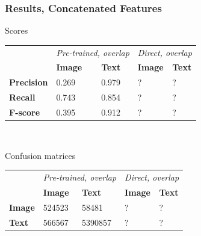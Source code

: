 \begin{frame}
\frametitle{Results, Concatenated Features}

\begin{block}{Scores}
\begin{tabular}{l l l  | l l}
 & \multicolumn{2}{c}{\emph{Pre-trained, overlap}} & \multicolumn{2}{c}{\emph{Direct, overlap}} \\
& \textbf{Image} & \textbf{Text} & \textbf{Image} & \textbf{Text} \\
\textbf{Precision} & 0.269 & 0.979 & ? & ? \\
\textbf{Recall} & 0.743 & 0.854 & ? & ? \\
\textbf{F-score} & 0.395 & 0.912 & ? & ? 
\end{tabular} \\
\end{block}

\begin{block}{Confusion matrices}
\begin{tabular}{l l l | l l }
& \multicolumn{2}{c}{\emph{Pre-trained, overlap}} & \multicolumn{2}{c}{\emph{Direct, overlap}} \\
 & \textbf{Image} & \textbf{Text} & \textbf{Image} & \textbf{Text} \\
\textbf{Image} & 524523 & 58481 & ? & ? \\
\textbf{Text} & 566567 & 5390857 & ? & ?
\end{tabular}
\end{block}



\end{frame}
